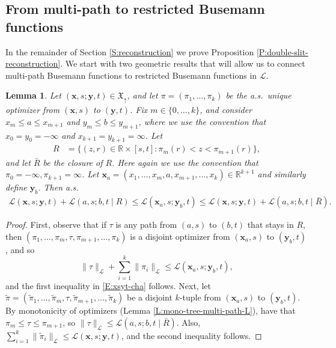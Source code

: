 \documentclass[11pt]{article}
\newcommand{\R}{\mathbb{R}}
\newcommand{\cL}{\mathcal{L}}
\newcommand{\X}{\times}
\newcommand{\bx}{\mathbf{x}}
\newcommand{\by}{\mathbf{y}}
\newtheorem{lemma}[theorem]{Lemma}
\theoremstyle{definition} %
\theoremstyle{remark} %
\begin{document}
\subsection{From multi-path to restricted Busemann functions}
\label{SS:multi-path-to-restricted}

In the remainder of Section \ref{S:reconstruction} we prove Proposition \ref{P:double-slit-reconstruction}. We start with  two geometric results that will allow us to connect multi-path Busemann functions to restricted Busemann functions in $\cL$. 


\begin{lemma}
	\label{L:strong-quadrangle}
	Let $(\bx, s; \by, t) \in \mathfrak X_\uparrow$, and let $\pi = (\pi_1, \dots, \pi_k)$ be the a.s.\ unique optimizer from $(\bx, s)$ to $(\by, t)$. Fix  $m \in \{0, \dots, k\}$, and consider $x_m \le a \le x_{m+1}$ and $y_m \le b \le y_{m+1}$, where we use the convention that $x_0 = y_0 = -\infty$ and $x_{k+1} = y_{k+1} = \infty$. Let 
	\begin{align*}
	R &= \{(z, r) \in \R \X [s, t] : \pi_m(r) < z < \pi_{m+1}(r)\},
	\end{align*}
	and let $\bar R$ be the closure of $R$. Here again we use the convention that $\pi_0 = -\infty, \pi_{k+1} = \infty$. 
	Let $\bx_a = (x_1, \dots, x_m, a, x_{m+1}, \dots, x_k) \in \R^{k+1}$ and similarly define $\by_b$. Then a.s.\
	\begin{align}
	\label{E:xsyt-cha}
	\cL(\bx, s; \by, t) + \cL(a, s; b, t \mid R) \le \cL(\bx_a, s; \by_b, t) \le \cL(\bx, s; \by, t) + \cL(a, s; b, t \mid \bar R).
	\end{align}
\end{lemma}

\begin{proof}
First, observe that if $\tau$ is any path from $(a, s)$ to $(b, t)$ that stays in $R$, then $(\pi_1, \dots, \pi_m, \tau, \pi_{m+1}, \dots, \pi_k)$ is a disjoint optimizer from $(\bx_a, s)$ to $(\by_b, t)$, and so
$$
\|\tau\|_\cL + \sum_{i=1}^k \|\pi_i\|_\cL \le \cL(\bx_a, s; \by_b, t),
$$
and the first inequality in \eqref{E:xsyt-cha} follows. Next, let $\tilde \pi = (\tilde \pi_1, \dots, \tilde \pi_m, \tau, \tilde \pi_{m+1}, \dots, \tilde \pi_k)$ be a disjoint $k$-tuple from $(\bx_a, s)$ to $(\by_b, t)$. By monotonicity of optimizers (Lemma \ref{L:mono-tree-multi-path-L}), have that $\pi_m \le \tau \le \pi_{m+1}$, so $\|\tau\|_\cL \le \cL(a, s; b, t \mid \bar R)$. Also, $\sum_{i=1}^k \|\tilde \pi_i\|_\cL \le \cL(\bx, s; \by, t)$, and the second inequality follows.
\end{proof}
\end{document}
